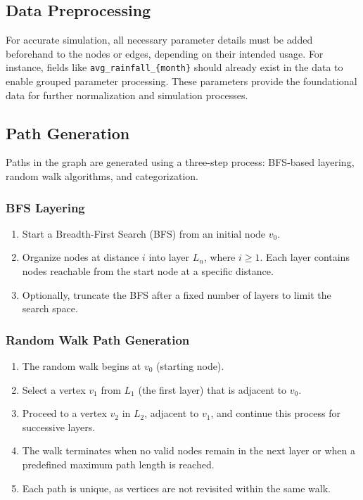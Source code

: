 \documentclass[a4paper,UKenglish,cleveref, autoref, thm-restate]{lipics-v2021}
\begin{document}
\subsection{Data Preprocessing}
For accurate simulation, all necessary parameter details must be added beforehand to the nodes or edges, depending on their intended usage. For instance, fields like \texttt{avg\_rainfall\_\{month\}} should already exist in the data to enable grouped parameter processing. These parameters provide the foundational data for further normalization and simulation processes.

\subsection{Path Generation}
Paths in the graph are generated using a three-step process: BFS-based layering, random walk algorithms, and categorization.

\subsubsection{BFS Layering}
\begin{enumerate}
    \item Start a Breadth-First Search (BFS) from an initial node $v_0$.
    \item Organize nodes at distance $i$ into layer $L_n$, where $i \geq 1$. Each layer contains nodes reachable from the start node at a specific distance.
    \item Optionally, truncate the BFS after a fixed number of layers to limit the search space.
\end{enumerate}

\subsubsection{Random Walk Path Generation}
\begin{enumerate}
    \item The random walk begins at $v_0$ (starting node).
    \item Select a vertex $v_1$ from $L_1$ (the first layer) that is adjacent to $v_0$.
    \item Proceed to a vertex $v_2$ in $L_2$, adjacent to $v_1$, and continue this process for successive layers.
    \item The walk terminates when no valid nodes remain in the next layer or when a predefined maximum path length is reached.
    \item Each path is unique, as vertices are not revisited within the same walk.
\end{enumerate}
\end{document}
